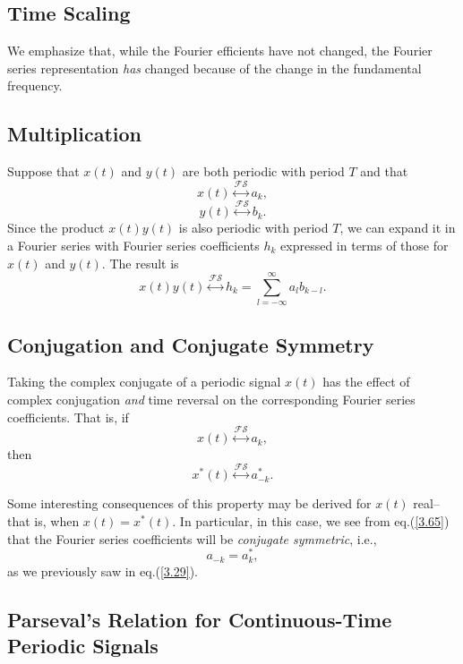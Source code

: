 \documentclass[a4paper,10pt,twoside]{book}
\begin{document}
\subsection{Time Scaling}

We emphasize that, while the Fourier efficients have not changed, the Fourier series representation \textit{has} changed because of the change in the fundamental frequency.

\subsection{Multiplication}

Suppose that $x(t)$ and $y(t)$ are both periodic with period $T$ and that $$x(t)\overset{\mathcal{FS}}{\longleftrightarrow}a_k,$$$$y(t)\overset{\mathcal{FS}}{\longleftrightarrow}b_k.$$ Since the product $x(t)y(t)$ is also periodic with period $T$, we can expand it in a Fourier series with Fourier series coefficients $h_k$ expressed in terms of those for $x(t)$ and $y(t)$. The result is
\begin{equation}
    x(t)y(t)\overset{\mathcal{FS}}{\longleftrightarrow} h_k=\sum_{l=-\infty}^\infty a_lb_{k-l}.
    \label{3.64}
\end{equation}

\subsection{Conjugation and Conjugate Symmetry}

Taking the complex conjugate of a periodic signal $x(t)$ has the effect of complex conjugation \textit{and} time reversal on the corresponding Fourier series coefficients. That is, if $$x(t)\overset{\mathcal{FS}}{\longleftrightarrow}a_k,$$ then
\begin{equation}
    x^*(t)\overset{\mathcal{FS}}{\longleftrightarrow}a_{-k}^*.
    \label{3.65}
\end{equation}

Some interesting consequences of this property may be derived for $x(t)$ real--that is, when $x(t)=x^*(t)$. In particular, in this case, we see from eq.\;(\ref{3.65}) that the Fourier series coefficients will be \textit{conjugate symmetric}, i.e.,
\begin{equation}
    a_{-k}=a_k^*,
    \label{3.66}
\end{equation}
as we previously saw in eq.\;(\ref{3.29}).

\subsection{Parseval's Relation for Continuous-Time Periodic Signals}
\end{document}
